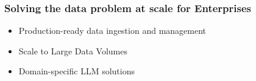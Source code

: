 \begin{frame}[fragile]\frametitle{Solving the data problem at scale for Enterprises}


\begin{itemize}
\item Production-ready data ingestion and management
\item Scale to Large Data Volumes
\item Domain-specific LLM solutions
\end{itemize}	

\end{frame}


